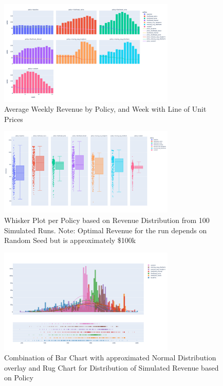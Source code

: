 \documentclass[11pt,a4paper]{article}
\begin{document}
\begin{figure}[h]
    \centering
    \includegraphics[width=0.75\textwidth]{pic/f6.png}
    \caption{Average Weekly Revenue by Policy, and Week with Line of Unit Prices}
\end{figure}
\pagebreak
\hfill \break
\begin{figure}[h]
    \centering
    \includegraphics[width=0.75\textwidth]{pic/f7.png}
    \caption{Whisker Plot per Policy based on Revenue Distribution from 100 Simulated Runs. Note: Optimal Revenue for the run depends on Random Seed but is approximately \$100k}
\end{figure}
\hfill \break
\begin{figure}[h]
    \centering
    \includegraphics[width=0.75\textwidth]{pic/f8.png}
    \caption{Combination of Bar Chart with approximated Normal Distribution overlay and Rug Chart for Distribution of Simulated Revenue based on Policy}
\end{figure}
\end{document}
